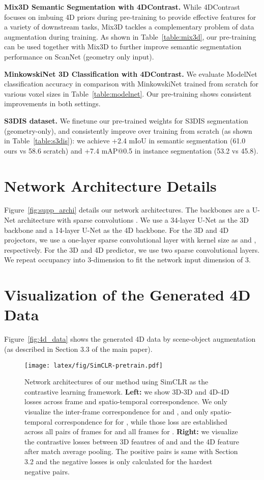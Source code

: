 \documentclass[runningheads]{llncs}
\newcommand{\OURS}{4DContrast}
\begin{document}
\noindent\textbf{Mix3D Semantic Segmentation with \OURS{}.} While \OURS{} focuses on imbuing 4D priors during pre-training to provide effective features for a variety of downstream tasks, Mix3D \cite{nekrasov2021mix3d} tackles a complementary problem of data augmentation during training. 
As shown in Table~\ref{table:mix3d}, our pre-training can be used together with Mix3D to further improve semantic segmentation performance on ScanNet (geometry only input).

\noindent\textbf{MinkowskiNet 3D Classification with \OURS{}.}  We evaluate ModelNet classification accuracy in comparison with MinkowskiNet \cite{choy20194d} trained from scratch for various voxel sizes in Table~\ref{table:modelnet}. Our pre-training shows consistent improvements in both settings.

\noindent\textbf{S3DIS dataset.} We finetune our pre-trained weights for S3DIS \cite{armeni2017joint} segmentation (geometry-only), and consistently improve over training from scratch (as shown in Table~\ref{table:s3dis}): we achieve +2.4 mIoU in semantic segmentation (61.0 ours vs 58.6 scratch) and +7.4 mAP@0.5 in instance segmentation (53.2 vs 45.8).


\section{Network Architecture Details}
Figure~\ref{fig:supp_archi} details our network architectures. The backbones are a U-Net architecture with sparse convolutions \cite{choy20194d}. We use a 34-layer U-Net as the 3D backbone and a 14-layer U-Net as the 4D backbone. For the 3D and 4D projectors, we use a one-layer sparse convolutional layer with kernel size as  and  , respectively. For the 3D and 4D predictor, we use two sparse convolutional layers. We repeat occupancy into 3-dimension to fit the network input dimension of 3.

\section{Visualization of the Generated 4D Data}
Figure~\ref{fig:4d_data} shows the generated 4D data by scene-object augmentation (as described in Section 3.3 of the main paper).

\begin{figure*}[h]
\texttt{[image: latex/fig/SimCLR-pretrain.pdf]}
    \caption{Network architectures of our method using SimCLR as the contrastive learning framework. \textbf{Left:} we show 3D-3D and 4D-4D losses across frame and spatio-temporal correspondence. We only visualize the inter-frame correspondence for  and , and only spatio-temporal correspondence for for , while those loss are established across all pairs of frames for  and all frames for .
    \textbf{Right:} we visualize the contrastive losses between 3D feautres of  and  and the 4D feature after match average pooling. The positive pairs is same with Section 3.2 and the negative losses is only calculated for the hardest negative pairs.
    }
    \label{fig:simclr_archi}
\end{figure*}
\end{document}
